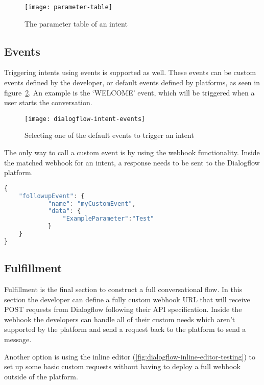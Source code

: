 \begin{figure}[ht]
	\centering
	\texttt{[image: parameter-table]}\label{fig:parameter-table}
	\caption{The parameter table of an intent}
\end{figure}

\subsection{Events}

Triggering intents using events is supported as well. These events can be custom events defined by the developer, or default events defined by platforms, as seen in figure~\ref{fig:dialogflow-intent-events}. An example is the `WELCOME' event, which will be triggered when a user starts the conversation.

\begin{figure}[ht]
	\centering
	\texttt{[image: dialogflow-intent-events]}\label{fig:dialogflow-intent-events}
	\caption{Selecting one of the default events to trigger an intent}
\end{figure}

The only way to call a custom event is by using the webhook functionality. Inside the matched webhook for an intent, a response needs to be sent to the Dialogflow platform.

\begin{lstlisting}[language=JavaScript,caption=The response that needs to be sent to the Dialogflow API to trigger a custom event,label=listing:webhook-send-event]
{
	"followupEvent": {
			"name": "myCustomEvent",
			"data": {
				"ExampleParameter":"Test"
			}
	}
}
\end{lstlisting}

\subsection{Fulfillment}

Fulfillment is the final section to construct a full conversational flow. In this section the developer can define a fully custom webhook URL that will receive POST requests from Dialogflow following their API specification. Inside the webhook the developers can handle all of their custom needs which aren't supported by the platform and send a request back to the platform to send a message.

Another option is using the inline editor (\ref{fig:dialogflow-inline-editor-testing}) to set up some basic custom requests without having to deploy a full webhook outside of the platform.